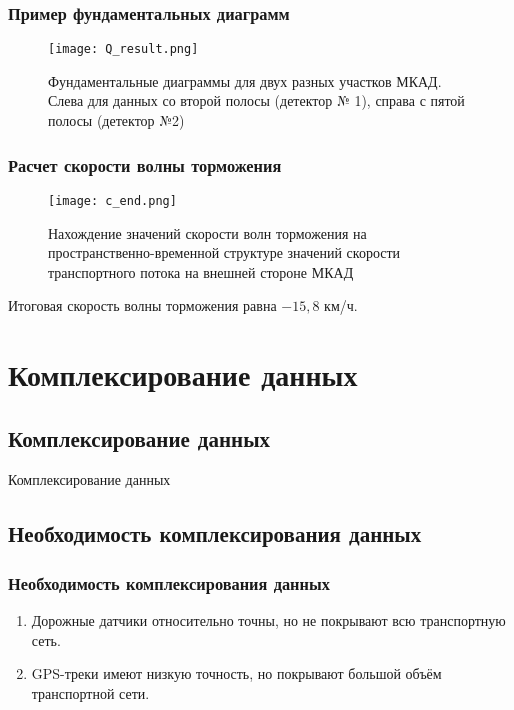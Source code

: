 \begin{frame}
    \frametitle{Пример фундаментальных диаграмм}
    \begin{figure}[ht]
        \begin{center}
            \texttt{[image: Q\_result.png]}
            \caption{Фундаментальные диаграммы для двух разных участков МКАД. Слева для данных со второй полосы (детектор № 1), справа с пятой полосы (детектор №2)}
        \end{center}
    \end{figure}

\end{frame}

\begin{frame}
    \frametitle{Расчет скорости волны торможения}
    \begin{figure}[ht]
        \begin{center}
            \texttt{[image: c\_end.png]}
            \caption{Нахождение значений скорости волн торможения на пространственно-временной структуре значений скорости транспортного потока на внешней стороне МКАД}
        \end{center}
    \end{figure}

    Итоговая скорость волны торможения равна \(-15,8\) км/ч.
\end{frame}


\section{Комплексирование данных}
\subsection{Комплексирование данных}
\begin{frame}
    \begin{center}
        \Huge
        Комплексирование данных
    \end{center}
\end{frame}

\subsection{Необходимость комплексирования данных}
\begin{frame}
    \frametitle{Необходимость комплексирования данных}
    \begin{enumerate}
      \item Дорожные датчики относительно точны, но не покрывают всю транспортную сеть.
      \item GPS-треки имеют низкую точность, но покрывают большой объём транспортной сети.
    \end{enumerate}
\end{frame}

